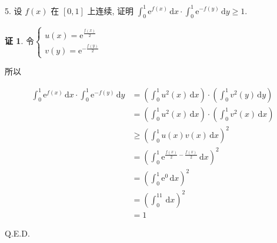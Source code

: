 \documentclass[a4paper,12pt]{article}
\theoremstyle{definition}
\newtheorem*{pf}{证}
\begin{document}
5. 设 $f(x)$ 在 $[0,1]$ 上连续, 证明 $\displaystyle\int_{0}^{1} \mathrm{e}^{f(x)}\,\mathrm{d}x \cdot \int_{0}^{1} \mathrm{e}^{-f(y)}\,\mathrm{d}y \geq 1$.
\begin{pf}
    令$\begin{cases}
            u(x)=\mathrm{e}^{\frac{f(x)}{2}} \\
            v(y)=\mathrm{e}^{-\frac{f(y)}{2}}
        \end{cases}$

    所以

    \begin{align*}
        \int_{0}^{1} \mathrm{e}^{f(x)}\,\mathrm{d}x \cdot \int_{0}^{1} \mathrm{e}^{-f(y)}\,\mathrm{d}y
         & =(\int_0^1u^2(x)\,\mathrm{d}x)\cdot(\int_0^1v^2(y)\,\mathrm{d}y)     \\
         & =(\int_0^1u^2(x)\,\mathrm{d}x)\cdot(\int_0^1v^2(x)\,\mathrm{d}x)     \\
         & \geq(\int_0^1u(x)v(x)\,\mathrm{d}x)^2                                \\
         & =(\int_0^1\mathrm{e}^{\frac{f(x)}{2}-\frac{f(x)}{2}}\,\mathrm{d}x)^2 \\
         & =(\int_0^1\mathrm{e}^0\,\mathrm{d}x)^2                               \\
         & =(\int_0^11\,\mathrm{d}x)^2                                          \\
         & =1
    \end{align*}

    Q.E.D.
\end{pf}
\end{document}
